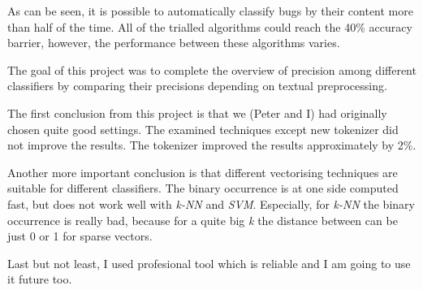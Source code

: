  
As can be seen, it is possible to automatically classify bugs by their content more than half of the time. All of the trialled algorithms could reach the 40\% accuracy barrier, however, the performance between these algorithms varies. 

The goal of this project was to complete the overview of precision among different classifiers by comparing their precisions depending on textual preprocessing.

The first conclusion from this project is that we (Peter and I) had originally chosen quite good settings. 
The examined techniques except new tokenizer did not improve the results. The tokenizer improved the results approximately by 2\%.

Another more important conclusion is that different vectorising 
techniques are suitable for different classifiers.
The binary occurrence is at one side computed fast, but does not work well with {\it k-NN} and {\it SVM}. Especially, for {\it k-NN} the binary occurrence is really bad, because for a quite big {\it k} the distance between can be just 0 or 1 for sparse vectors.   

Last but not least, I used profesional tool which is reliable
and I am going to use it future too.
